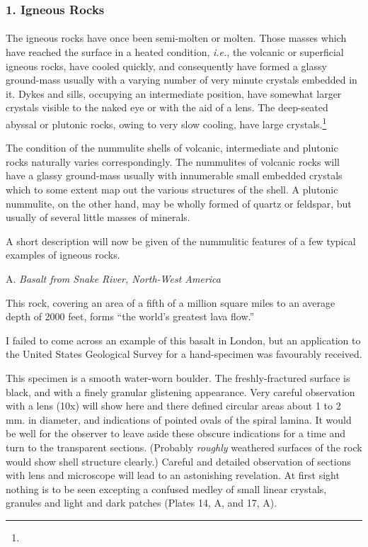 \documentclass[a4paper, 12pt, oneside]{article}
\begin{document}
\subsubsection{1. Igneous Rocks}
\paragraph{}
The igneous rocks have once been semi-molten or molten. Those masses which have reached the surface in a heated condition, \emph{i.e.}, the volcanic or superficial igneous rocks, have cooled quickly, and consequently have formed a glassy ground-mass usually with a varying number of very minute crystals embedded in it. Dykes and sills, occupying an intermediate position, have somewhat larger crystals visible to the naked eye or with the aid of a lens. The deep-seated abyssal or plutonic rocks, owing to very slow cooling, have large crystals.\footnote{}

The condition of the nummulite shells of volcanic, intermediate and plutonic rocks naturally varies correspondingly. The nummulites of volcanic rocks will have a glassy ground-mass usually with innumerable small embedded crystals which to some extent map out the various structures of the shell. A plutonic nummulite, on the other hand, may be wholly formed of quartz or feldspar, but usually of several little masses of minerals.

A short description will now be given of the nummulitic features of a few typical examples of igneous rocks.

\bigskip
\centerline{A. \emph{Basalt from Snake River, North-West America}}

This rock, covering an area of a fifth of a million square miles to an average depth of 2000 feet, forms ``the world's greatest lava flow.''

I failed to come across an example of this basalt in London, but an application to the United States Geological Survey for a hand-specimen was favourably received.

This specimen is a smooth water-worn boulder. The freshly-fractured surface is black, and with a finely granular glistening appearance. Very careful observation with a lens (10x) will show here and there defined circular areas about 1 to 2 mm. in diameter, and indications of pointed ovals of the spiral lamina. It would be well for the observer to leave aside these obscure indications for a time and turn to the transparent sections. (Probably \emph{roughly} weathered surfaces of the rock would show shell structure clearly.) Careful and detailed observation of sections with lens and microscope will lead to an astonishing revelation. At first sight nothing is to be seen excepting a confused medley of small linear crystals, granules and light and dark patches (Plates 14, A, and 17, A).
\end{document}
